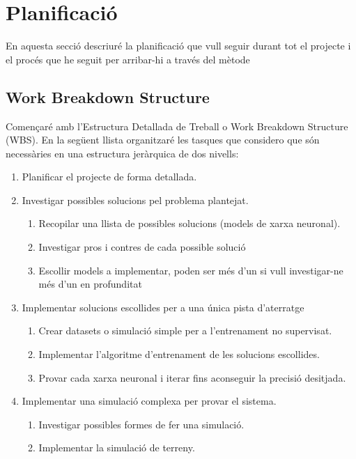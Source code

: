 \documentclass[10pt,a4paper,twocolumn,twoside]{article}
\begin{document}
\section{Planificació}

En aquesta secció descriuré la planificació que vull seguir durant tot el
projecte i el procés que he seguit per arribar-hi a través del mètode

\subsection{Work Breakdown Structure}
Començaré amb l'Estructura Detallada de Treball o Work Breakdown Structure (WBS).
En la següent llista organitzaré les tasques que considero que són 
necessàries en una estructura jeràrquica de dos nivells:

\begin{enumerate}
    \item Planificar el projecte de forma detallada.
    \item Investigar possibles solucions pel problema plantejat.
    \begin{enumerate}[label*=\arabic*.]
        \item Recopilar una llista de possibles solucions (models de xarxa neuronal).
        \item Investigar pros i contres de cada possible solució
        \item Escollir models a implementar, poden ser més d'un si vull investigar-ne més d'un en profunditat
    \end{enumerate}
    \item Implementar solucions escollides per a una única pista d'aterratge
    \begin{enumerate}[label*=\arabic*.]
        \item Crear datasets o simulació simple per a l'entrenament no supervisat.
        \item Implementar l'algoritme d'entrenament de les solucions escollides.
        \item Provar cada xarxa neuronal i iterar fins aconseguir la precisió desitjada.
    \end{enumerate}
    \item Implementar una simulació complexa per provar el sistema.
    \begin{enumerate}[label*=\arabic*.]
        \item Investigar possibles formes de fer una simulació.
        \item Implementar la simulació de terreny.

\end{enumerate}
\end{enumerate}
\end{document}
